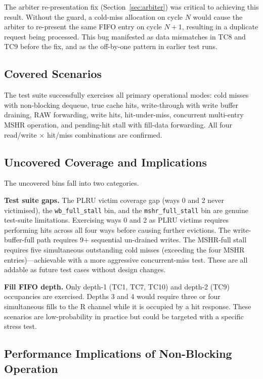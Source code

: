 \documentclass[12pt,letterpaper]{report}
\begin{document}
The arbiter re-presentation fix (Section~\ref{sec:arbiter}) was
critical to achieving this result.  Without the guard, a cold-miss
allocation on cycle $N$ would cause the arbiter to re-present the same
FIFO entry on cycle $N{+}1$, resulting in a duplicate request being
processed.  This bug manifested as data mismatches in TC8 and TC9
before the fix, and as the off-by-one pattern in earlier test runs.

\subsection{Covered Scenarios}

The test suite successfully exercises all primary operational modes:
cold misses with non-blocking dequeue, true cache hits, write-through
with write buffer draining, RAW forwarding, write hits, hit-under-miss,
concurrent multi-entry MSHR operation, and pending-hit stall with
fill-data forwarding.  All four read/write $\times$ hit/miss
combinations are confirmed.

\subsection{Uncovered Coverage and Implications}

The uncovered bins fall into two categories.

\textbf{Test suite gaps.}  The PLRU victim coverage gap (ways 0 and 2
never victimised), the \texttt{wb\_full\_stall} bin, and the
\texttt{mshr\_full\_stall} bin are genuine test-suite limitations.
Exercising ways 0 and 2 as PLRU victims requires performing hits
across all four ways before causing further evictions.  The
write-buffer-full path requires 9+ sequential un-drained writes.
The MSHR-full stall requires five simultaneous outstanding cold misses
(exceeding the four MSHR entries)---achievable with a more aggressive
concurrent-miss test.  These are all addable as future test cases
without design changes.

\textbf{Fill FIFO depth.}  Only depth-1 (TC1, TC7, TC10) and
depth-2 (TC9) occupancies are exercised.  Depths 3 and 4 would require
three or four simultaneous fills to the R channel while it is occupied
by a hit response.  These scenarios are low-probability in practice but
could be targeted with a specific stress test.

\subsection{Performance Implications of Non-Blocking Operation}
\end{document}
